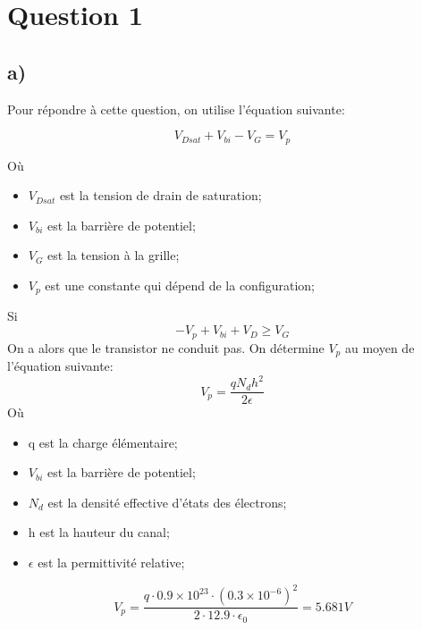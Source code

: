 



\label{s:experimentation}
\chapter*{Question 1}
\section*{a)}
Pour répondre à cette question, on utilise l'équation suivante:

\begin{equation}
V_{Dsat} + V_{bi} - V_G = V_p
\end{equation}

Où
\begin{itemize}
\item $V_{Dsat}$ est la tension de drain de saturation;
\item $V_{bi}$ est la barrière de potentiel;
\item $V_G$ est la tension à la grille;
\item $V_p$ est une constante qui dépend de la configuration;
\end{itemize}

Si
\begin{equation}
-V_p + V_{bi} + V_D \geq V_G
\end{equation}
On a alors que le transistor ne conduit pas. On détermine $V_p$ au moyen de l'équation suivante:
\begin{equation}
V_p =\frac{qN_d h^2}{2\epsilon}
\end{equation}
Où
\begin{itemize}
\item q est la charge élémentaire;
\item $V_{bi}$ est la barrière de potentiel;
\item $N_d$ est la densité effective d'états des électrons;
\item h est la hauteur du canal;
\item $\epsilon$ est la permittivité relative;
\end{itemize}
\begin{equation}
V_p = \frac{q\cdot 0.9\times 10^{23} \cdot \left(0.3\times 10^{-6}\right)^2}{2\cdot 12.9 \cdot \epsilon_0} = 5.681V
\end{equation}

